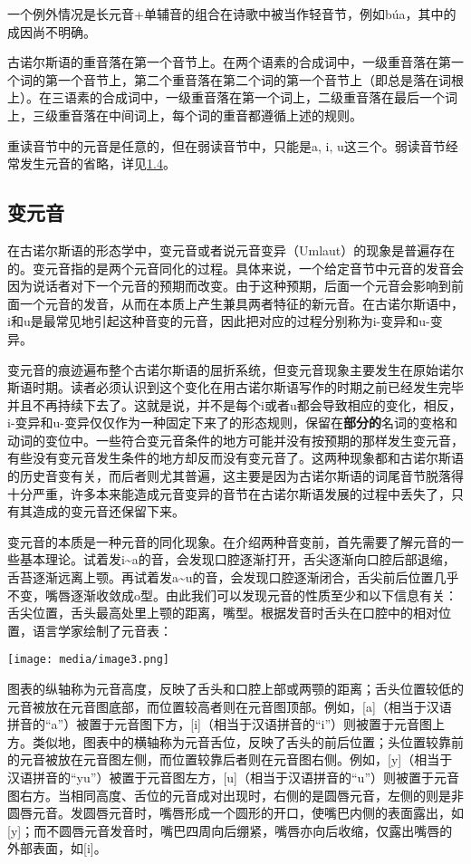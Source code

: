 一个例外情况是长元音+单辅音的组合在诗歌中被当作轻音节，例如búa，其中的成因尚不明确。

古诺尔斯语的重音落在第一个音节上。在两个语素的合成词中，一级重音落在第一个词的第一个音节上，第二个重音落在第二个词的第一个音节上（即总是落在词根上）。在三语素的合成词中，一级重音落在第一个词上，二级重音落在最后一个词上，三级重音落在中间词上，每个词的重音都遵循上述的规则。

重读音节中的元音是任意的，但在弱读音节中，只能是a, i,
u这三个。弱读音节经常发生元音的省略，详见\hyperref[ux8bedux97f3ux89c4ux5219]{1.4}。

\subsection{变元音}\label{ux53d8ux5143ux97f3}

在古诺尔斯语的形态学中，变元音或者说元音变异（Umlaut）的现象是普遍存在的。变元音指的是两个元音同化的过程。具体来说，一个给定音节中元音的发音会因为说话者对下一个元音的预期而改变。由于这种预期，后面一个元音会影响到前面一个元音的发音，从而在本质上产生兼具两者特征的新元音。在古诺尔斯语中，i和u是最常见地引起这种音变的元音，因此把对应的过程分别称为i-变异和u-变异。

变元音的痕迹遍布整个古诺尔斯语的屈折系统，但变元音现象主要发生在原始诺尔斯语时期。读者必须认识到这个变化在用古诺尔斯语写作的时期之前已经发生完毕并且不再持续下去了。这就是说，并不是每个i或者u都会导致相应的变化，相反，i-变异和u-变异仅仅作为一种固定下来了的形态规则，保留在\textbf{部分的}名词的变格和动词的变位中。一些符合变元音条件的地方可能并没有按预期的那样发生变元音，有些没有变元音发生条件的地方却反而没有变元音了。这两种现象都和古诺尔斯语的历史音变有关，而后者则尤其普遍，这主要是因为古诺尔斯语的词尾音节脱落得十分严重，许多本来能造成元音变异的音节在古诺尔斯语发展的过程中丢失了，只有其造成的变元音还保留下来。

变元音的本质是一种元音的同化现象。在介绍两种音变前，首先需要了解元音的一些基本理论。试着发i\textasciitilde a的音，会发现口腔逐渐打开，舌尖逐渐向口腔后部退缩，舌苔逐渐远离上颚。再试着发a\textasciitilde u的音，会发现口腔逐渐闭合，舌尖前后位置几乎不变，嘴唇逐渐收敛成o型。由此我们可以发现元音的性质至少和以下信息有关：舌尖位置，舌头最高处里上颚的距离，嘴型。根据发音时舌头在口腔中的相对位置，语言学家绘制了元音表：

\texttt{[image: media/image3.png]}

图表的纵轴称为元音高度，反映了舌头和口腔上部或两颚的距离；舌头位置较低的元音被放在元音图底部，而位置较高者则在元音图顶部。例如，{[}a{]}（相当于汉语拼音的``a''）被置于元音图下方，{[}i{]}（相当于汉语拼音的``i''）则被置于元音图上方。类似地，图表中的横轴称为元音舌位，反映了舌头的前后位置；头位置较靠前的元音被放在元音图左侧，而位置较靠后者则在元音图右侧。例如，{[}y{]}（相当于汉语拼音的``yu''）被置于元音图左方，{[}u{]}（相当于汉语拼音的``u''）则被置于元音图右方。当相同高度、舌位的元音成对出现时，右侧的是圆唇元音，左侧的则是非圆唇元音。发圆唇元音时，嘴唇形成一个圆形的开口，使嘴巴内侧的表面露出，如{[}y{]}；而不圆唇元音发音时，嘴巴四周向后绷紧，嘴唇亦向后收缩，仅露出嘴唇的外部表面，如{[}i{]}。

